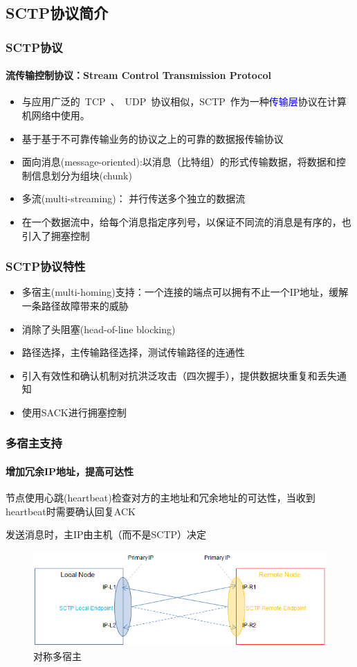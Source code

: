 \documentclass[xcolor={usenames,dvipsnames}]{beamer}
\begin{document}
\subsection{SCTP协议简介}
\begin{frame}
	\frametitle{SCTP\textbf{协议}\cite{stewartstream}}
	\framesubtitle{\textbf{流传输控制协议}：\textbf{S}tream \textbf{C}ontrol \textbf{T}ransmission \textbf{P}rotocol}
	\begin{itemize}
		\item 与应用广泛的~\textcolor{RoyalPurple}{TCP}~、~\textcolor{PineGreen}{UDP}~协议相似，SCTP~作为一种\textcolor{blue}{传输层}协议在计算机网络中使用。
		\item 基于\textcolor{PineGreen}{基于不可靠传输业务的协议}之上的\textcolor{RoyalPurple}{可靠的数据报传输协议}
		\item \textcolor{PineGreen}{面向消息}(message-oriented):以消息（比特组）的形式传输数据，将数据和控制信息划分为组块(chunk)		
		\item 多流(multi-streaming)： 并行传送多个独立的数据流
		\item 在一个数据流中，给每个消息指定序列号，以保证不同流的消息是\textcolor{RoyalPurple}{有序}的，也引入了\textcolor{RoyalPurple}{拥塞控制}
	\end{itemize}
\end{frame} 

\begin{frame}
	\frametitle{SCTP\textbf{协议特性}}
	\begin{itemize}
		\item 多宿主(multi-homing)支持：一个连接的端点可以拥有不止一个IP地址，缓解一条路径故障带来的威胁
		\item 消除了头阻塞(head-of-line blocking)
		\item 路径选择，主传输路径选择，测试传输路径的连通性
		\item 引入有效性和确认机制对抗洪泛攻击（四次握手），提供数据块重复和丢失通知	
		\item 使用SACK进行拥塞控制
	\end{itemize}
\end{frame}

\begin{frame}
	\frametitle{\textbf{多宿主支持}}
	\framesubtitle{\textbf{增加冗余IP地址，提高可达性}}
	\begin{block}{}
		节点使用心跳(heartbeat)检查对方的主地址和冗余地址的可达性，当收到heartbeat时需要确认回复ACK
	\end{block}
	\begin{alertblock}{}
			发送消息时，主IP由主机（而不是SCTP）决定
	\end{alertblock}
	\begin{figure}
		\includegraphics[width=0.7\linewidth]{pic/SCTP-multihoming.png}
		\caption{对称多宿主}
	\end{figure}
\end{frame}
\end{document}

